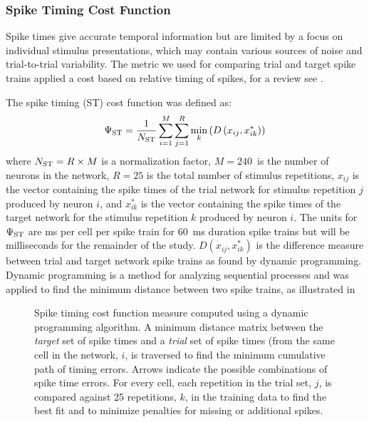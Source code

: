 \subsubsection{Spike Timing Cost Function}\label{sec:GA:spike-timing-cost-fn}


Spike times give accurate temporal information but are limited by a
focus on individual stimulus presentations, which may contain various
sources of noise and trial-to-trial variability. The metric we used
for comparing trial and target spike trains applied a cost based on
relative timing of spikes, for a review see \citet{Victor:2005}.

\medskip{}

The spike timing (ST) cost function was defined as:
\begin{equation} \label{eq:GA:2} 
\Psi _{{\rm ST}} = \frac{1}{N_{{\rm ST}}
  } \sum _{i=1}^{M}\sum _{j=1}^{R}\mathop{\min}\limits_{k}
  \left(D\left(x_{ij} ,x_{ik}^{*} \right)\right)
\end{equation}
\noindent where $N_{{\rm ST}} =R\times M$ is a normalization factor,
$M=240$~is the number of neurons in the network, $R=25$ is the total
number of stimulus repetitions, $x_{ij}$ is the vector containing the
spike times of the trial network for stimulus repetition $j$ produced
by neuron $i$, and $x_{ik}^{*}$ is the vector containing the spike
times of the target network for the stimulus repetition $k$ produced
by neuron $i$.  The units for $\Psi_{{\rm ST}}$ are ms per cell per
spike train for 60~ms duration spike trains but will be milliseconds
for the remainder of the study. $D(x_{ij} ,x_{ik}^{*})$ is the
difference measure between trial and target network spike trains as
found by dynamic programming.  Dynamic programming is a method for
analyzing sequential processes \citep{Denardo:1982} and was applied to
find the minimum distance between two spike trains, as illustrated in

\begin{figure}[t!]
 \resizebox{3in}{!}{}
  \caption{Spike timing cost function measure computed using a
    dynamic programming algorithm. A minimum distance matrix between
    the \textit{target} set of spike times and a \textit{trial} set
    of spike times (from the same cell in the network, $i$, is
    traversed to find the minimum cumulative path of timing
    errors. Arrows indicate the possible combinations of spike time
    errors. For every cell, each repetition in the trial set, $j$,
    is compared against 25 repetitions, $k$, in the training data to
    find the best fit and to minimize penalties for missing or
    additional spikes.}
\label{fig:GA:DynSpikeMetric}
\end{figure}

